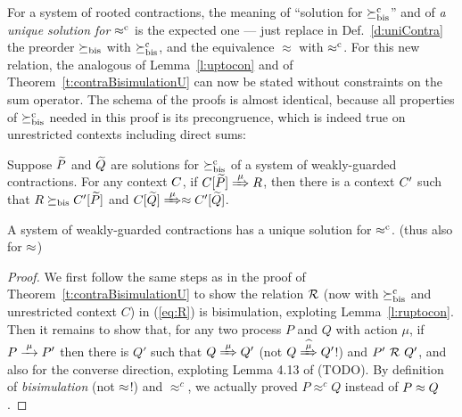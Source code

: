 For a system of rooted contractions, the meaning of 
``solution for $\mathrel{\succeq^{\rm{c}}_{\rm{bis}}}$'' and of \emph{a unique solution for $\mathrel{\approx^{\rm{c}}}$}
is the expected one --- just replace in Def.~\ref{d:uniContra}  the preorder 
$\mathrel{\succeq_{\rm{bis}}}$ with $\mathrel{\succeq^{\rm{c}}_{\rm{bis}}}$, and the equivalence 
$\approx$ with $\mathrel{\approx^{\rm{c}}}$.
%
For this new relation, the analogous of Lemma~\ref{l:uptocon} and of
Theorem~\ref{t:contraBisimulationU} can now be stated without constraints on the sum
operator.
The schema of the proofs is almost identical, because all 
properties of $\mathrel{\succeq^{\rm{c}}_{\rm{bis}}}$ needed in this proof is its precongruence, which is
indeed true on unrestricted contexts including direct sums:
\begin{lemma}
\label{l:ruptocon}
Suppose $\widetilde P$ and $\widetilde Q$ are solutions  for $\mathrel{\succeq^{\rm{c}}_{\rm{bis}}}$ 
 of a system of weakly-guarded
contractions.
For any context $C$, 
if  $\ct{\til P}\Arr{\mu}  R$,
 then 
there is a  context $C'$
such that $R \mathrel{\succeq_{\rm{bis}}} C' [\widetilde P]$ and  $\ct{\til Q} \Arr{\mu}
 \wb \ctp{\til Q}$.
\end{lemma}

\begin{theorem}
\label{t:rcontraBisimulationU}
A system of weakly-guarded contractions has a unique solution 
 for $\mathrel{\approx^{\rm{c}}}$. (thus also for $\approx$)
\end{theorem} 

\begin{proof}
We first follow the same steps as in the proof of Theorem~\ref{t:contraBisimulationU} to show the relation ${\cal R}$ (now
with $\mathrel{\succeq^{\rm{c}}_{\rm{bis}}}$ and unrestricted context $C$) in (\ref{eq:R}) is bisimulation,
exploting Lemma~\ref{l:ruptocon}. Then it remains to show that, for
any two process $P$ and $Q$ with action $\mu$, if $P \arr{\mu} P'$ then
there is $Q'$ such that $Q \Arr{\mu} Q'$ (not $Q \Arcap{\mu} Q'$!) and
$P'\ {\cal R}\ Q'$, and also for the converse direction, exploting Lemma
4.13 of \cite{Mil89} (TODO). By definition of
\emph{bisimulation} (not $\approx$!) and $\approx^c$, we actually proved $P
\approx^c Q$ instead of $P \approx Q$.
\end{proof}

